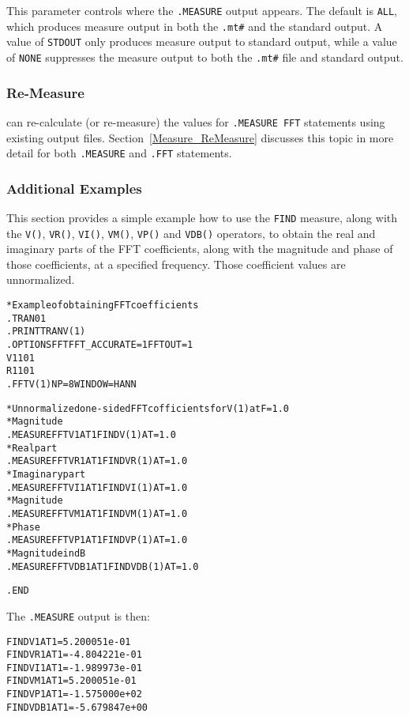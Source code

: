 \begin{Command}
\begin{Arguments}

This parameter controls where the {\tt .MEASURE} output appears.  The
default is {\tt ALL}, which produces measure output in both the
\texttt{.mt\#} and the standard output.  A value of {\tt STDOUT}
only produces measure output to standard output, while a value of
{\tt NONE} suppresses the measure output to both the \texttt{.mt\#}
file and standard output.

\end{Arguments}

\end {Command}

\subsubsection{Re-Measure}
\label{Measure_FFT_ReMeasure}
\Xyce{} can re-calculate (or re-measure) the values for {\tt .MEASURE FFT}
statements using existing \Xyce{} output files.  Section~\ref{Measure_ReMeasure}
discusses this topic in more detail for both {\tt .MEASURE} and {\tt .FFT}
statements.

\subsubsection{Additional Examples}
\label{Measure_FFT_Additional_Examples}
This section provides a simple example how to use the {\tt FIND} measure,
along with the {\tt V()}, {\tt VR()}, {\tt VI()}, {\tt VM()}, {\tt VP()}
and {\tt VDB()} operators, to obtain the real and imaginary parts of the
FFT coefficients, along with the magnitude and phase of those coefficients,
at a specified frequency.  Those coefficient values are unnormalized.

\begin{alltt}
* Example of obtaining FFT coefficients
.TRAN 0 1
.PRINT TRAN V(1)
.OPTIONS FFT FFT_ACCURATE=1 FFTOUT=1
V1 1 0 1
R1 1 0 1
.FFT V(1) NP=8 WINDOW=HANN

* Unnormalized one-sided FFT cofficients for V(1) at F=1.0
* Magnitude
.MEASURE FFT V1AT1 FIND V(1) AT=1.0
* Real part
.MEASURE FFT VR1AT1 FIND VR(1) AT=1.0
* Imaginary part
.MEASURE FFT VI1AT1 FIND VI(1) AT=1.0
* Magnitude
.MEASURE FFT VM1AT1 FIND VM(1) AT=1.0
* Phase
.MEASURE FFT VP1AT1 FIND VP(1) AT=1.0
* Magnitude in dB
.MEASURE FFT VDB1AT1 FIND VDB(1) AT=1.0

.END
\end{alltt}

The {\tt .MEASURE} output is then:
\begin{alltt}
FINDV1AT1 = 5.200051e-01
FINDVR1AT1 = -4.804221e-01
FINDVI1AT1 = -1.989973e-01
FINDVM1AT1 = 5.200051e-01
FINDVP1AT1 = -1.575000e+02
FINDVDB1AT1 = -5.679847e+00
\end{alltt}


